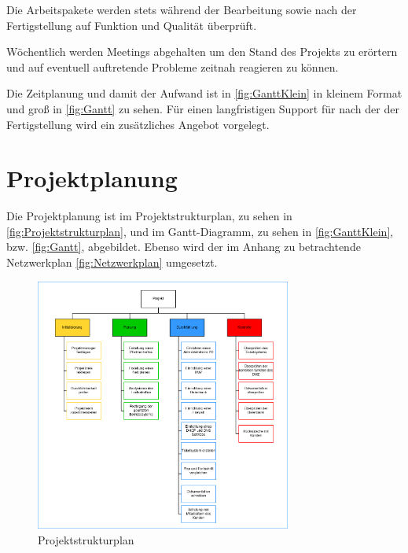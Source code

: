 \documentclass[a4paper,
    11pt,
    headings=small,
    ngerman,
    listof=totoc,
    numbers=noenddot]{scrreprt}[2021/11/13]
\begin{document}
Die Arbeitspakete werden stets während der Bearbeitung sowie nach der Fertigstellung auf Funktion und Qualität überprüft.

Wöchentlich werden Meetings abgehalten um den Stand des Projekts zu erörtern und auf eventuell auftretende Probleme zeitnah reagieren zu können.

Die Zeitplanung und damit der Aufwand ist in \vref{fig:GanttKlein} in kleinem Format und groß in \vref{fig:Gantt} zu sehen.  Für einen langfristigen Support für nach der der Fertigstellung wird ein zusätzliches Angebot vorgelegt.



\section{Projektplanung}

Die Projektplanung ist im Projektstrukturplan, zu sehen in \vref{fig:Projektstrukturplan}, und im Gantt-Diagramm, zu sehen in \vref{fig:GanttKlein}, bzw. \vref{fig:Gantt}, abgebildet.
Ebenso wird der im Anhang  zu betrachtende Netzwerkplan \vref{fig:Netzwerkplan} umgesetzt.

\begin{figure}[htbp]
  \centering
  \includegraphics[width=0.75\textwidth]{data/Projektstrukturplan.png}
  \caption{Projektstrukturplan}
  \label{fig:Projektstrukturplan}
\end{figure}
\end{document}
